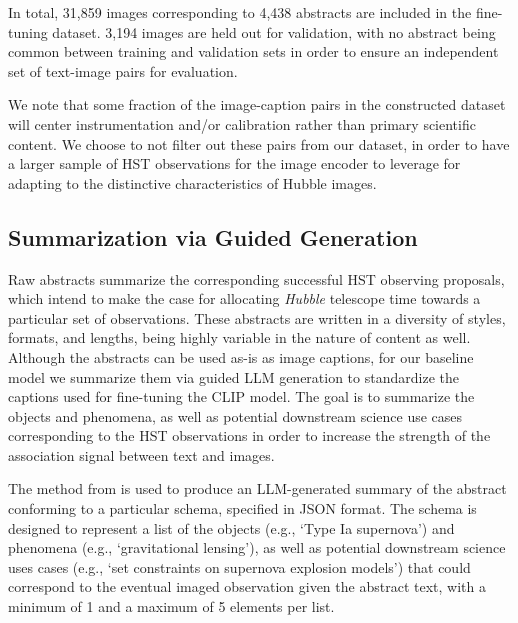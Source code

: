 \documentclass[10pt]{article} %
\newcommand{\hubble}{\emph{Hubble}\xspace}
\begin{document}
In total, 31,859 images corresponding to 4,438 abstracts are included in the fine-tuning dataset. 3,194 images are held out for validation, with no abstract being common between training and validation sets in order to ensure an independent set of text-image pairs for evaluation.

We note that some fraction of the image-caption pairs in the constructed dataset will center instrumentation and/or calibration rather than primary scientific content. We choose to not filter out these pairs from our dataset, in order to have a larger sample of HST observations for the image encoder to leverage for adapting to the distinctive characteristics of Hubble images.


\subsection{Summarization via Guided Generation}
\label{sec:summarization}

Raw abstracts summarize the corresponding successful HST observing proposals, which intend to make the case for allocating \hubble telescope time towards a particular set of observations. These abstracts are written in a diversity of styles, formats, and lengths, being highly variable in the nature of content as well. Although the abstracts can be used as-is as image captions, for our baseline model we summarize them via guided LLM generation to standardize the captions used for fine-tuning the CLIP model. The goal is to summarize the objects and phenomena, as well as potential downstream science use cases corresponding to the HST observations in order to increase the strength of the association signal between text and images.

The method from \cite{willard2023efficient} is used to produce an LLM-generated summary of the abstract conforming to a particular schema, specified in JSON format. The schema is designed to represent a list of the objects (e.g., `Type Ia supernova') and phenomena (e.g., `gravitational lensing'), as well as potential downstream science uses cases (e.g., `set constraints on supernova explosion models') that could correspond to the eventual imaged observation given the abstract text, with a minimum of 1 and a maximum of 5 elements per list.
\end{document}
